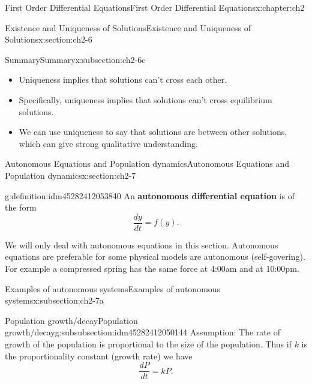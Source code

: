 \documentclass[oneside,10pt,]{book}
\newcommand{\terminology}[1]{\textbf{#1}}
\numberwithin{equation}{section}
\numberwithin{equation}{section}
\begin{document}
\begin{chapterptx}{First Order Differential Equations}{}{First Order Differential Equations}{}{}{x:chapter:ch2}
\begin{sectionptx}{Existence and Uniqueness of Solutions}{}{Existence and Uniqueness of Solutions}{}{}{x:section:ch2-6}
\begin{subsectionptx}{Summary}{}{Summary}{}{}{x:subsection:ch2-6c}
\begin{itemize}[label=\textbullet]
\item{}Uniqueness implies that solutions can't cross each other.%
\item{}Specifically, uniqueness implies that solutions can't cross equilibrium solutions.%
\item{}We can use uniqueness to say that solutions are between other solutions, which can give strong qualitative understanding.%
\end{itemize}
\end{subsectionptx}
\end{sectionptx}
%
%
\typeout{************************************************}
\typeout{************************************************}
%
\begin{sectionptx}{Autonomous Equations and Population dynamics}{}{Autonomous Equations and Population dynamics}{}{}{x:section:ch2-7}
\begin{introduction}{}%
\begin{definition}{}{g:definition:idm45282412053840}%
An \terminology{autonomous differential equation} is of the form%
\begin{equation*}
\frac{dy}{dt}=f(y).
\end{equation*}
%
\end{definition}
We will only deal with autonomous equations in this section. Autonomous equations are preferable for some physical models are autonomous (self-govering). For example a compressed spring has the same force at 4:00am and at 10:00pm.%
\end{introduction}%
%
%
\typeout{************************************************}
\typeout{************************************************}
%
\begin{subsectionptx}{Examples of autonomous systems}{}{Examples of autonomous systems}{}{}{x:subsection:ch2-7a}
%
%
\typeout{************************************************}
\typeout{************************************************}
%
\begin{subsubsectionptx}{Population growth\slash{}decay}{}{Population growth\slash{}decay}{}{}{g:subsubsection:idm45282412050144}
Assumption: The rate of growth of the population is proportional to the size of the population. Thus if \(k\) is the proportionality constant (growth rate) we have%
\begin{equation*}
\frac{dP}{dt}=kP.
\end{equation*}

\end{subsubsectionptx}
\end{subsectionptx}
\end{sectionptx}
\end{chapterptx}
\end{document}
